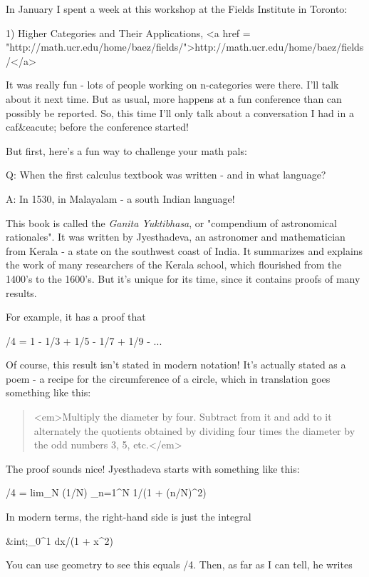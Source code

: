 


In January I spent a week at this workshop at the Fields Institute
in Toronto:

1) Higher Categories and Their Applications, <a href =
"http://math.ucr.edu/home/baez/fields/">http://math.ucr.edu/home/baez/fields/</a>

It was really fun - lots of people working on n-categories were there.
I'll talk about it next time.  But as usual, more happens at a fun
conference than can possibly be reported.  So, this time I'll only
talk about a conversation I had in a caf&eacute; before the conference
started!

But first, here's a fun way to challenge your math pals:

Q: When the first calculus textbook was written - and in what 
language?

A: In 1530, in Malayalam - a south Indian language!  

This book is called the \emph{Ganita Yuktibhasa}, or
"compendium of astronomical rationales".  It was written by
Jyesthadeva, an astronomer and mathematician from Kerala - a state on
the southwest coast of India.  It summarizes and explains the work of
many researchers of the Kerala school, which flourished from the
1400's to the 1600's.  But it's unique for its time, since it contains
proofs of many results.

For example, it has a proof that

\pi /4 = 1 - 1/3 + 1/5 - 1/7 + 1/9 - ...

Of course, this result isn't stated in modern notation!  It's
actually stated as a poem - a recipe for the circumference of 
a circle, which in translation goes something like this:

\begin{quote}
 <em>Multiply the diameter by four.  Subtract from it and add to it
 alternately the quotients obtained by dividing four times the 
 diameter by the odd numbers 3, 5, etc.</em>
\end{quote}

The proof sounds nice!  Jyesthadeva starts with something like this:

\pi /4 = lim_{N \to  \infty } (1/N) \sum_{n=1}^{N} 1/(1 + (n/N)^{2})

In modern terms, the right-hand side is just the integral

&int;_{0}^{1} dx/(1 + x^{2}) 
 
You can use geometry to see this equals \pi /4.  Then, as far as 
I can tell, he writes

